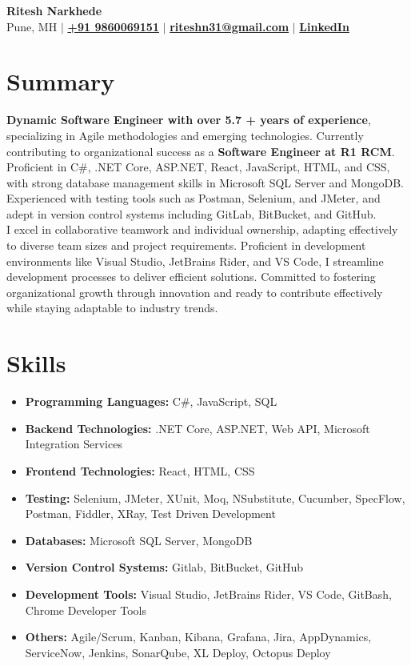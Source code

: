 \documentclass{article}
\begin{document}
\pagestyle{empty}

\begin{center}
    \textbf{\LARGE Ritesh Narkhede}\\
    Pune, MH $\vert$ 
    \href{tel:+919860069151}{\textbf{+91 9860069151}} $\vert$ \href{mailto:riteshn31@gmail.com}{\textbf{riteshn31@gmail.com}} $\vert$ \href{https://www.linkedin.com/in/ritesh-narkhede-79963a108}{\textbf{LinkedIn}}
\end{center}

\section*{Summary}

\noindent
\textbf{Dynamic Software Engineer with over 5.7 + years of experience}, specializing in Agile methodologies and emerging technologies. Currently contributing to organizational success as a \textbf{Software Engineer at R1 RCM}. Proficient in C\#, .NET Core, ASP.NET, React, JavaScript, HTML, and CSS, with strong database management skills in Microsoft SQL Server and MongoDB. Experienced with testing tools such as Postman, Selenium, and JMeter, and adept in version control systems including GitLab, BitBucket, and GitHub.
\medskip\\
\noindent
I excel in collaborative teamwork and individual ownership, adapting effectively to diverse team sizes and project requirements. Proficient in development environments like Visual Studio, JetBrains Rider, and VS Code, I streamline development processes to deliver efficient solutions. Committed to fostering organizational growth through innovation and ready to contribute effectively while staying adaptable to industry trends.

\section*{Skills}
\begin{itemize}[label=]
	\item \textbf{Programming Languages:} C\#, JavaScript, SQL
	\item \textbf{Backend Technologies:} .NET Core, ASP.NET, Web API, Microsoft Integration Services 
	\item \textbf{Frontend Technologies:} React, HTML, CSS 
	\item \textbf{Testing:} Selenium, JMeter, XUnit, Moq, NSubstitute, Cucumber, SpecFlow, Postman, Fiddler, XRay, Test Driven Development 
	\item \textbf{Databases:} Microsoft SQL Server, MongoDB 
	\item \textbf{Version Control Systems:} Gitlab, BitBucket, GitHub 
	\item \textbf{Development Tools:} Visual Studio, JetBrains Rider, VS Code, GitBash, Chrome Developer Tools 
	\item \textbf{Others:} Agile/Scrum, Kanban, Kibana, Grafana, Jira, AppDynamics, ServiceNow, Jenkins, SonarQube, XL Deploy, Octopus Deploy
\end{itemize}
\end{document}
